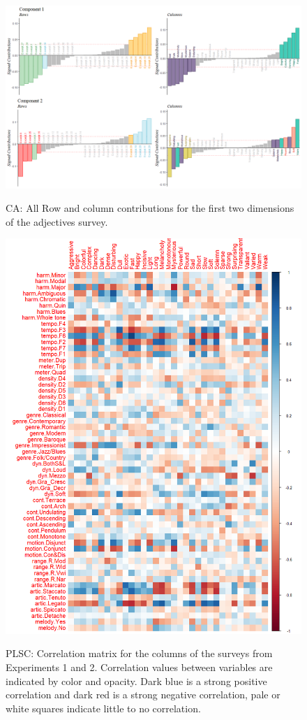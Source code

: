\documentclass[
]{article}
\begin{document}
\begin{figure}   
  \centering  
  \caption{CA: All Row and column contributions for the first two dimensions of the adjectives survey.}
    \includegraphics{./supmatsimgs/acontsordered.png}
  \label{fig:aconts}
\end{figure}

\begin{figure}   
  \centering  
  \caption{PLSC: Correlation matrix for the columns of the surveys from Experiments 1 and 2. Correlation values between variables are indicated by color and opacity. Dark blue is a strong positive correlation and dark red is a strong negative correlation, pale or white squares indicate little to no correlation.}
    \includegraphics{./supmatsimgs/pcorrplot.png}
  \label{fig:pcorr}
\end{figure}
\end{document}

